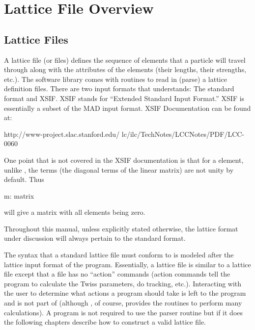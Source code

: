 \chapter{Lattice File Overview}

\section{Lattice Files}
\label{s:lattice_file_formats}

A lattice file (or files) defines the sequence of elements that a
particle will travel through along with the attributes of the elements
(their lengths, their strengths, etc.). 
The \bmad software library comes with routines to read in (parse) a
lattice definition files. There are two input formats that
\bmad understands: The \bmad standard format and
XSIF\cite{b:xsif}. XSIF stands for ``Extended Standard Input Format.''
XSIF is essentially a subset of the MAD input format. XSIF
Documentation
can be found at:
\begin{example}
  http://www-project.slac.stanford.edu/
              lc/ilc/TechNotes/LCCNotes/PDF/LCC-0060%
\end{example}
One point that is not covered in the XSIF documentation is that for a
 element, unlike \mad, the  terms (the diagonal
terms of the linear matrix) are not unity by default. Thus
\begin{example}
  m: matrix
\end{example}
will give a matrix with all elements being zero.

Throughout this manual, unless explicitly
stated otherwise, the lattice format under discussion
will always pertain to the \bmad standard format.

The syntax that a \bmad standard lattice file must conform to is
modeled after the lattice input format of the \mad program.
Essentially, a \bmad lattice file is similar to a \mad lattice file
except that a \bmad file has no ``action'' commands (action commands
tell the program to calculate the Twiss parameters, do tracking,
etc.).  Interacting with the user to determine what actions a program
should take is left to the program and is not part of \bmad (although
\bmad, of course, provides the routines to perform many
calculations). A program is not required to use the \bmad parser
routine but if it does the following chapters describe how to
construct a valid lattice file.

